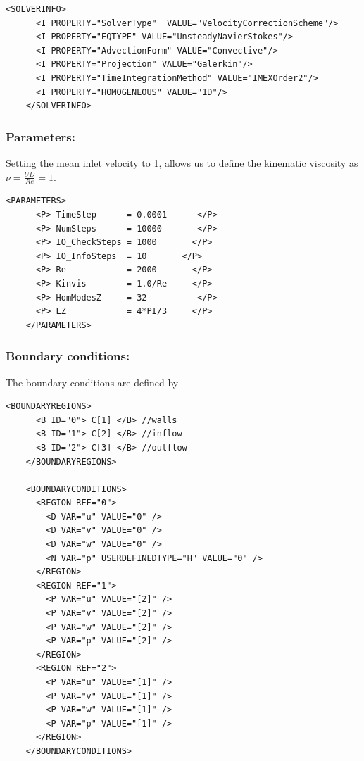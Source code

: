 \begin{lstlisting}[style=XMLStyle]
    <SOLVERINFO>
      <I PROPERTY="SolverType"  VALUE="VelocityCorrectionScheme"/>
      <I PROPERTY="EQTYPE" VALUE="UnsteadyNavierStokes"/>
      <I PROPERTY="AdvectionForm" VALUE="Convective"/>
      <I PROPERTY="Projection" VALUE="Galerkin"/>
      <I PROPERTY="TimeIntegrationMethod" VALUE="IMEXOrder2"/>
      <I PROPERTY="HOMOGENEOUS" VALUE="1D"/>
    </SOLVERINFO>
\end{lstlisting}

\subsubsection{Parameters:~} Setting the mean inlet velocity to 1, allows us to define the kinematic viscosity as $\nu = \frac{UD}{Re}=1$.
\begin{lstlisting}[style=XMLStyle]
    <PARAMETERS>
      <P> TimeStep      = 0.0001      </P>
      <P> NumSteps      = 10000       </P>
      <P> IO_CheckSteps = 1000       </P>
      <P> IO_InfoSteps  = 10       </P>
      <P> Re            = 2000       </P>
      <P> Kinvis        = 1.0/Re     </P>
      <P> HomModesZ     = 32          </P>
      <P> LZ            = 4*PI/3     </P>
    </PARAMETERS>
\end{lstlisting}

\subsubsection{Boundary conditions:~} The boundary conditions are defined by
\begin{lstlisting}[style=XMLStyle]
    <BOUNDARYREGIONS>
      <B ID="0"> C[1] </B> //walls
      <B ID="1"> C[2] </B> //inflow
      <B ID="2"> C[3] </B> //outflow
    </BOUNDARYREGIONS>

    <BOUNDARYCONDITIONS>
      <REGION REF="0">
        <D VAR="u" VALUE="0" />
        <D VAR="v" VALUE="0" />
        <D VAR="w" VALUE="0" />
        <N VAR="p" USERDEFINEDTYPE="H" VALUE="0" />  
      </REGION>
      <REGION REF="1">
        <P VAR="u" VALUE="[2]" />
        <P VAR="v" VALUE="[2]" />
        <P VAR="w" VALUE="[2]" />
        <P VAR="p" VALUE="[2]" />
      </REGION>
      <REGION REF="2">
        <P VAR="u" VALUE="[1]" />
        <P VAR="v" VALUE="[1]" />
        <P VAR="w" VALUE="[1]" />
        <P VAR="p" VALUE="[1]" />
      </REGION>
    </BOUNDARYCONDITIONS>
\end{lstlisting}

